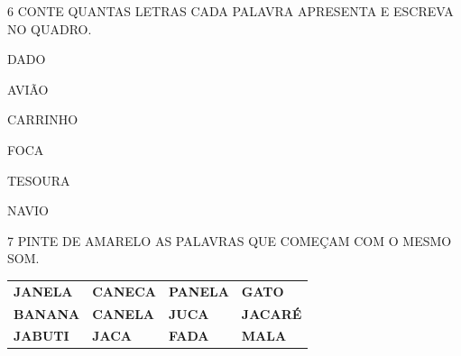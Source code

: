 \begin{escola}





\num{6} CONTE QUANTAS LETRAS CADA PALAVRA APRESENTA E ESCREVA NO QUADRO.

DADO

AVIÃO

CARRINHO

FOCA

TESOURA

NAVIO

\num{7} PINTE DE AMARELO AS PALAVRAS QUE COMEÇAM COM O MESMO SOM.


\begin{longtable}[]{@{}llll@{}}
\toprule
\textbf{JANELA} & \textbf{CANECA} & \textbf{PANELA} &
\textbf{GATO}\tabularnewline
\textbf{BANANA} & \textbf{CANELA} & \textbf{JUCA} &
\textbf{JACARÉ}\tabularnewline
\textbf{JABUTI} & \textbf{JACA} & \textbf{FADA} &
\textbf{MALA}\tabularnewline
\bottomrule
\end{longtable}


\end{escola}
